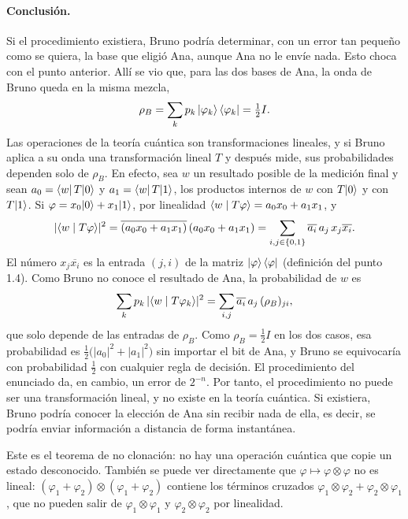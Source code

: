 \paragraph{Conclusión.} Si el procedimiento existiera, Bruno podría determinar, con un error tan pequeño como se quiera, la base que eligió Ana, aunque Ana no le envíe nada. Esto choca con el punto anterior. Allí se vio que, para las dos bases de Ana, la onda de Bruno queda en la misma mezcla,
\[
  \rho_B=\sum_k p_k\,\lvert \varphi_k\rangle\bra{\varphi_k}=\tfrac12 I .
\]
Las operaciones de la teoría cuántica son transformaciones lineales, y si Bruno aplica a su onda una transformación lineal $T$ y después mide, sus probabilidades dependen solo de $\rho_B$. En efecto, sea $w$ un resultado posible de la medición final y sean $a_0=\bra{w}T\lvert 0\rangle$ y $a_1=\bra{w}T\lvert 1\rangle$, los productos internos de $w$ con $T\lvert 0\rangle$ y con $T\lvert 1\rangle$. Si $\varphi=x_0\lvert 0\rangle+x_1\lvert 1\rangle$, por linealidad $\langle w\mid T\varphi\rangle=a_0x_0+a_1x_1$, y
\[
  |\langle w\mid T\varphi\rangle|^2=\overline{(a_0x_0+a_1x_1)}\,(a_0x_0+a_1x_1)=\sum_{i,j\in\{0,1\}}\overline{a_i}\,a_j\,x_j\overline{x_i}.
\]
El número $x_j\overline{x_i}$ es la entrada $(j,i)$ de la matriz $\lvert \varphi\rangle\bra\varphi$ (definición del punto 1.4). Como Bruno no conoce el resultado de Ana, la probabilidad de $w$ es
\[
  \sum_k p_k\,|\langle w\mid T\varphi_k\rangle|^2=\sum_{i,j}\overline{a_i}\,a_j\,(\rho_B)_{ji},
\]
que solo depende de las entradas de $\rho_B$. Como $\rho_B=\frac12 I$ en los dos casos, esa probabilidad es $\frac12\bigl(|a_0|^2+|a_1|^2\bigr)$ sin importar el bit de Ana, y Bruno se equivocaría con probabilidad $\frac12$ con cualquier regla de decisión. El procedimiento del enunciado da, en cambio, un error de $2^{-n}$. Por tanto, el procedimiento no puede ser una transformación lineal, y no existe en la teoría cuántica. Si existiera, Bruno podría conocer la elección de Ana sin recibir nada de ella, es decir, se podría enviar información a distancia de forma instantánea.

Este es el teorema de no clonación: no hay una operación cuántica que copie un estado desconocido. También se puede ver directamente que $\varphi\mapsto\varphi\otimes\varphi$ no es lineal: $(\varphi_1+\varphi_2)\otimes(\varphi_1+\varphi_2)$ contiene los términos cruzados $\varphi_1\otimes\varphi_2+\varphi_2\otimes\varphi_1$, que no pueden salir de $\varphi_1\otimes\varphi_1$ y $\varphi_2\otimes\varphi_2$ por linealidad.
